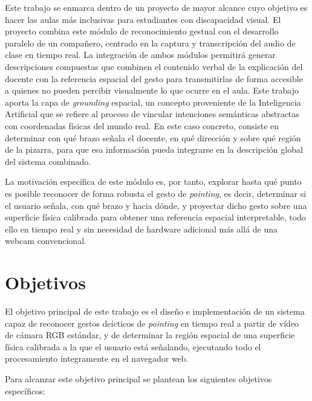 \documentclass[12pt]{report} %
\begin{document}
Este trabajo se enmarca dentro de un proyecto de mayor alcance cuyo objetivo es hacer las aulas más inclusivas para estudiantes con discapacidad visual. El proyecto combina este módulo de reconocimiento gestual con el desarrollo paralelo de un compañero, centrado en la captura y transcripción del audio de clase en tiempo real. La integración de ambos módulos permitirá generar descripciones compuestas que combinen el contenido verbal de la explicación del docente con la referencia espacial del gesto para transmitirlas de forma accesible a quienes no pueden percibir visualmente lo que ocurre en el aula. Este trabajo aporta la capa de \textit{grounding} espacial, un concepto proveniente de la Inteligencia Artificial que se refiere al proceso de vincular intenciones semánticas abstractas con coordenadas físicas del mundo real. En este caso concreto, consiste en determinar con qué brazo señala el docente, en qué dirección y sobre qué región de la pizarra, para que esa información pueda integrarse en la descripción global del sistema combinado.

La motivación específica de este módulo es, por tanto, explorar hasta qué punto es posible reconocer de forma robusta el gesto de \textit{pointing}, es decir, determinar si el usuario señala, con qué brazo y hacia dónde, y proyectar dicho gesto sobre una superficie física calibrada para obtener una referencia espacial interpretable, todo ello en tiempo real y sin necesidad de hardware adicional más allá de una webcam convencional.

\section{Objetivos}

El objetivo principal de este trabajo es el diseño e implementación de un sistema capaz de reconocer gestos deícticos de \textit{pointing} en tiempo real a partir de vídeo de cámara RGB estándar, y de determinar la región espacial de una superficie física calibrada a la que el usuario está señalando, ejecutando todo el procesamiento íntegramente en el navegador web.

Para alcanzar este objetivo principal se plantean los siguientes objetivos específicos:
\end{document}
